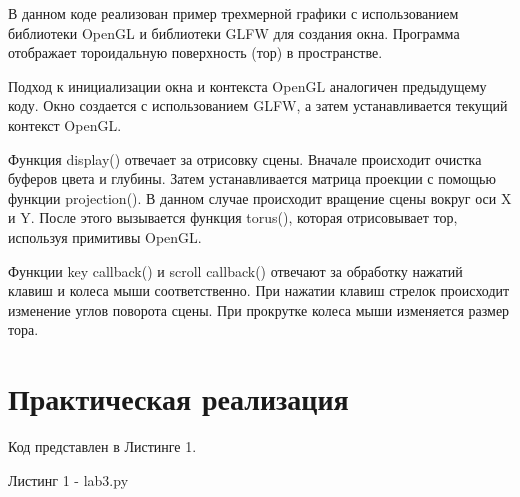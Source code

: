 \documentclass[a4paper, 14pt]{extarticle}
\begin{document}
\par
В данном коде реализован пример трехмерной графики с использованием библиотеки OpenGL и библиотеки GLFW для создания окна. Программа отображает тороидальную поверхность (тор) в пространстве.
\par
Подход к инициализации окна и контекста OpenGL аналогичен предыдущему коду. Окно создается с использованием GLFW, а затем устанавливается текущий контекст OpenGL.
\par
Функция display() отвечает за отрисовку сцены. Вначале происходит очистка буферов цвета и глубины. Затем устанавливается матрица проекции с помощью функции projection(). В данном случае происходит вращение сцены вокруг оси X и Y. После этого вызывается функция torus(), которая отрисовывает тор, используя примитивы OpenGL.
\par
Функции key callback() и scroll callback() отвечают за обработку нажатий клавиш и колеса мыши соответственно. При нажатии клавиш стрелок происходит изменение углов поворота сцены. При прокрутке колеса мыши изменяется размер тора.

\pagebreak
\section{Практическая реализация}
Код представлен в Листинге 1.
\par
\begin{center}
    Листинг 1 - lab3.py
\end{center}
\end{document}
